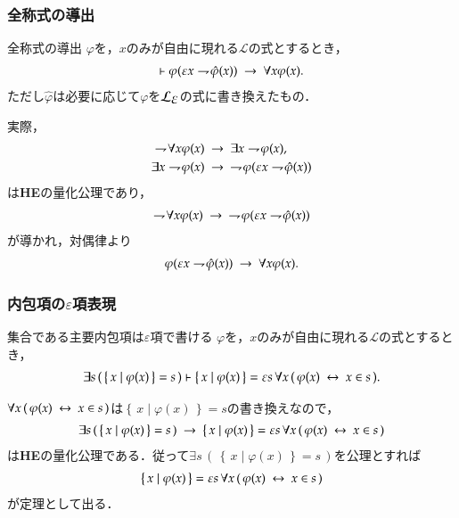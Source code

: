 \documentclass[dvipdfmx,10pt,notheorems]{beamer}
\theoremstyle{definition}
\newcommand{\lang}[1]{\mathcal{L}_{\scalebox{1.2}{$#1$}}} %
\newcommand{\Set}[2]{\left\{\, #1 \mid #2\, \right\}} %
\newcommand{\negation}{\rightharpoondown\hspace{-0.25em}} %
\newcommand{\rarrow}{\hspace{0.25em}\rightarrow\hspace{0.25em}} %
\newcommand{\lrarrow}{\hspace{0.25em}\leftrightarrow\hspace{0.25em}} %
\begin{document}
\begin{frame}\frametitle{全称式の導出}
	\begin{block}{全称式の導出}
		$\varphi$を，$x$のみが自由に現れる$\mathcal{L}$の式とするとき，
		\begin{align}
			\vdash \varphi(\varepsilon x \negation \hat{\varphi}(x)) \rarrow \forall x \varphi(x).
		\end{align}
		ただし$\hat{\varphi}$は必要に応じて$\varphi$を$\lang{\varepsilon}$の式に書き換えたもの．
	\end{block}
	実際，
	\begin{align}
		\negation \forall x \varphi(x) &\rarrow \exists x \negation \varphi(x), \\
		\exists x \negation \varphi(x) &\rarrow\ \negation \varphi(\varepsilon x \negation \hat{\varphi}(x))
	\end{align}
	は{\bf HE}の量化公理であり，
	\begin{align}
		\negation \forall x \varphi(x) \rarrow\ \negation \varphi(\varepsilon x \negation \hat{\varphi}(x))
	\end{align}
	が導かれ，対偶律より
	\begin{align}
		\varphi(\varepsilon x \negation \hat{\varphi}(x)) \rarrow \forall x \varphi(x).
	\end{align}
\end{frame}

\begin{frame}\frametitle{内包項の$\varepsilon$項表現}
	\begin{block}{集合である主要内包項は$\varepsilon$項で書ける}
		$\varphi$を，$x$のみが自由に現れる$\mathcal{L}$の式とするとき，
		\begin{align}
			\exists s\, (\, \Set{x}{\varphi(x)} = s\, )
			\vdash \Set{x}{\varphi(x)} = 
			\varepsilon s\, \forall x\, (\, \varphi(x) \lrarrow x \in s\, ).
		\end{align}
	\end{block}
	
	$\forall x\, (\, \varphi(x) \lrarrow x \in s\, )$は$\Set{x}{\varphi(x)} = s$の書き換えなので，
	\begin{align}
		\exists s\, (\, \Set{x}{\varphi(x)} = s\, ) \rarrow 
		\Set{x}{\varphi(x)} = \varepsilon s\, \forall x\, (\, \varphi(x) \lrarrow x \in s\, )
	\end{align}
	は{\bf HE}の量化公理である．従って$\exists s\, (\, \Set{x}{\varphi(x)} = s\, )$を公理とすれば
	\begin{align}
		\Set{x}{\varphi(x)} = \varepsilon s\, \forall x\, (\, \varphi(x) \lrarrow x \in s\, )
	\end{align}
	が定理として出る．
\end{frame}
\end{document}
